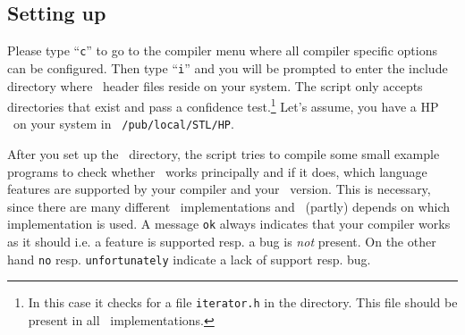 \subsection{Setting up \stl \label{sec:set-up-stl}}

Please type ``\texttt{c}'' to go to the compiler menu where all
compiler specific options can be configured. Then type ``\texttt{i}''
and you will be prompted to enter the include directory where \stl\ 
header files reside on your system. The script only accepts
directories that exist and pass a confidence test.\footnote{In this
  case it checks for a file \texttt{iterator.h} in the directory.
  This file should be present in all \stl\ implementations.} Let's
assume, you have a \textsc{HP} \stl\ on your system in {\tt
  /pub/local/STL/HP}.

After you set up the \stl\ directory, the script tries to compile some
small example programs to check whether \stl\ works principally and if
it does, which language features are supported by your compiler and
your \stl\ version. This is necessary, since there are many different
\stl\ implementations and \cgal\ (partly) depends on which
implementation is used. A message \texttt{ok} always indicates that
your compiler works as it should i.e. a feature is supported resp. a
bug is \textit{not} present. On the other hand \texttt{no} resp.
\texttt{unfortunately} indicate a lack of support resp. bug.

